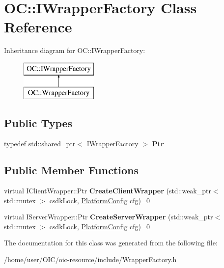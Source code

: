 \hypertarget{classOC_1_1IWrapperFactory}{}\section{O\+C\+:\+:I\+Wrapper\+Factory Class Reference}
\label{classOC_1_1IWrapperFactory}
Inheritance diagram for O\+C\+:\+:I\+Wrapper\+Factory\+:\begin{figure}[H]
\begin{center}
\leavevmode
\includegraphics[height=2.000000cm]{classOC_1_1IWrapperFactory}
\end{center}
\end{figure}
\subsection*{Public Types}
\begin{DoxyCompactItemize}
\item 
\hypertarget{classOC_1_1IWrapperFactory_aa652203fa13f2f4651c10d2c09dd48d6}{}typedef std\+::shared\+\_\+ptr$<$ \hyperlink{classOC_1_1IWrapperFactory}{I\+Wrapper\+Factory} $>$ {\bfseries Ptr}\label{classOC_1_1IWrapperFactory_aa652203fa13f2f4651c10d2c09dd48d6}

\end{DoxyCompactItemize}
\subsection*{Public Member Functions}
\begin{DoxyCompactItemize}
\item 
\hypertarget{classOC_1_1IWrapperFactory_a99bbd34dc0390b75efd5b5de55fb6352}{}virtual I\+Client\+Wrapper\+::\+Ptr {\bfseries Create\+Client\+Wrapper} (std\+::weak\+\_\+ptr$<$ std\+::mutex $>$ csdk\+Lock, \hyperlink{structOC_1_1PlatformConfig}{Platform\+Config} cfg)=0\label{classOC_1_1IWrapperFactory_a99bbd34dc0390b75efd5b5de55fb6352}

\item 
\hypertarget{classOC_1_1IWrapperFactory_a25a4cb7ca863c34f408791380ced127f}{}virtual I\+Server\+Wrapper\+::\+Ptr {\bfseries Create\+Server\+Wrapper} (std\+::weak\+\_\+ptr$<$ std\+::mutex $>$ csdk\+Lock, \hyperlink{structOC_1_1PlatformConfig}{Platform\+Config} cfg)=0\label{classOC_1_1IWrapperFactory_a25a4cb7ca863c34f408791380ced127f}

\end{DoxyCompactItemize}


The documentation for this class was generated from the following file\+:\begin{DoxyCompactItemize}
\item 
/home/user/\+O\+I\+C/oic-\/resource/include/Wrapper\+Factory.\+h\end{DoxyCompactItemize}
